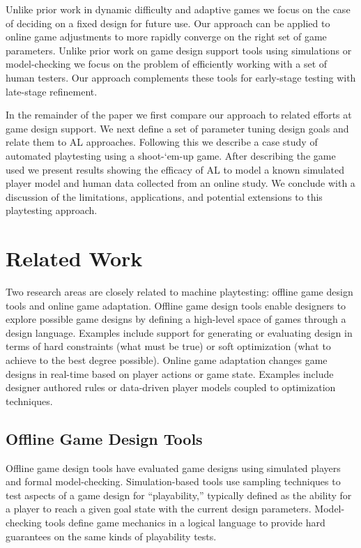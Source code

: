 \documentclass{sig-alternate}
\begin{document}
Unlike prior work in dynamic difficulty and adaptive games we focus on the case of deciding on a fixed design for future use.
Our approach can be applied to online game adjustments to more rapidly converge on the right set of game parameters.
Unlike prior work on game design support tools using simulations or model-checking we focus on the problem of efficiently working with a set of human testers.
Our approach complements these tools for early-stage testing with late-stage refinement.

In the remainder of the paper we first compare our approach to related efforts at game design support.
We next define a set of parameter tuning design goals and relate them to AL approaches.
Following this we describe a case study of automated playtesting using a shoot-`em-up game.
After describing the game used we present results showing the efficacy of AL to model a known simulated player model and human data collected from an online study.
We conclude with a discussion of the limitations, applications, and potential extensions to this playtesting approach.




\section{Related Work}

Two research areas are closely related to machine playtesting: offline game design tools and online game adaptation.
Offline game design tools enable designers to explore possible game designs by defining a high-level space of games through a design language.
Examples include support for generating or evaluating design in terms of hard constraints (what must be true) or soft optimization (what to achieve to the best degree possible).
Online game adaptation changes game designs in real-time based on player actions or game state.
Examples include designer authored rules or data-driven player models coupled to optimization techniques.



\subsection{Offline Game Design Tools}
Offline game design tools have evaluated game designs using simulated players and formal model-checking.
Simulation-based tools use sampling techniques to test aspects of a game design for ``playability,'' typically defined as the ability for a player to reach a given goal state with the current design parameters.
Model-checking tools define game mechanics in a logical language to provide hard guarantees on the same kinds of playability tests.
\end{document}
